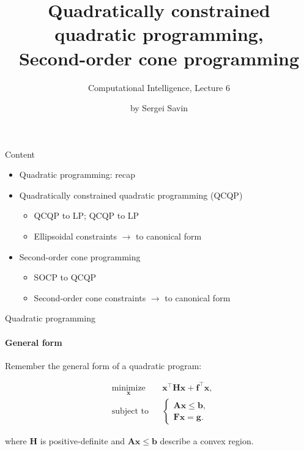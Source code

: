 \documentclass{beamer}
\title{Quadratically constrained quadratic programming, \\ Second-order cone programming}
\subtitle{Computational Intelligence, Lecture 6}
\author{by Sergei Savin}
\date{\mydate}
\begin{document}
\maketitle


\begin{frame}{Content}

\begin{itemize}
\item  Quadratic programming: recap
\item  Quadratically constrained quadratic programming (QCQP)
	\begin{itemize}
		\item  QCQP to LP; QCQP to LP
		\item  Ellipsoidal constraints $\rightarrow$ to canonical form
	\end{itemize}
\item  Second-order cone programming
	\begin{itemize}
		\item  SOCP to QCQP
		\item  Second-order cone constraints $\rightarrow$ to canonical form
	\end{itemize}
\end{itemize}

\end{frame}



\begin{frame}{Quadratic programming}
\framesubtitle{General form}
\begin{flushleft}

Remember the general form of a quadratic program:

%
\begin{equation}
\begin{aligned}
& \underset{\mathbf{x}}{\text{minimize}}
& & \mathbf{x}^\top \mathbf{H} \mathbf{x} + \mathbf{f}^\top\mathbf{x}, \\
& \text{subject to}
& & \begin{cases}
    \mathbf{A}\mathbf{x} \leq \mathbf{b}, \\
    \mathbf{F}\mathbf{x} = \mathbf{g}.
    \end{cases}
\end{aligned}
\end{equation}

where $\mathbf{H}$ is positive-definite and $\mathbf{A}\mathbf{x} \leq \mathbf{b}$ describe a convex region.
 
\end{flushleft}
\end{frame}
\end{document}
